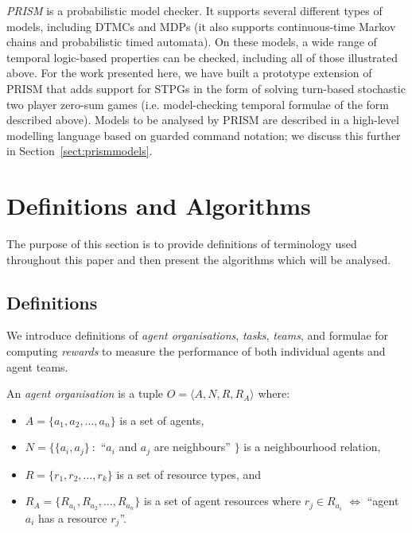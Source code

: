 \documentclass{llncs}
\begin{document}
\emph{PRISM} \cite{KNP11} is a probabilistic model checker.
It supports several different types of models, including DTMCs and MDPs
(it also supports continuous-time Markov chains and probabilistic timed automata).
On these models, a wide range of temporal logic-based properties can be checked,
including all of those illustrated above.
For the work presented here, we have built a prototype extension of PRISM
that adds support for STPGs in the form of solving turn-based stochastic two player zero-sum games (i.e. model-checking temporal formulae of the form described above).
Models to be analysed by PRISM are described in a
high-level modelling language based on guarded command notation;
we discuss this further in Section~\ref{sect:prismmodels}.
\section{Definitions and Algorithms}
The purpose of this section is to provide definitions of terminology
used throughout this paper and then present the algorithms which will be analysed.
\subsection{Definitions}
We introduce definitions of \emph{agent organisations}, \emph{tasks}, \emph{teams}, and formulae for computing \emph{rewards} to measure the performance of both individual agents and agent teams.
\begin{definition}
An \emph{agent organisation} is a tuple $O=\langle A, N, R, R_A  \rangle$ where:
\noindent
\begin{itemize}
\item $A= \{ a_1,a_2,...,a_n \} $ is a set of agents,
\item $N=\{\{a_i,a_j \}\ :$ ``$a_i$ and $a_j$ are neighbours'' $\}$ is a neighbourhood relation,
\item $R=\{r_1,r_2,\dots,r_k\}$ is a set of resource types, and
\item $R_A=\{R_{a_1}, R_{a_2}, \dots, R_{a_n}\}$ is a set of agent resources where $r_j \in R_{a_i} $ $\iff$ ``agent $a_i$ has a resource $r_j$''.
\end{itemize}
\end{definition}
\end{document}
